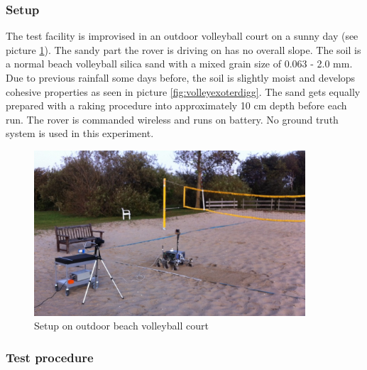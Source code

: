 \documentclass[a4paper,twocolumn]{esapub2005} %
\begin{document}
\subsubsection{Setup}
The test facility is improvised in an outdoor volleyball court on a sunny day (see picture \ref{fig:volley}). The sandy part the rover is driving on has no overall slope. The soil is a normal beach volleyball silica sand with a mixed grain size of 0.063 - 2.0 mm. Due to previous rainfall some days before, the soil is slightly moist and develops cohesive properties as seen in picture \ref{fig:volleyexoterdigg}. The sand gets equally prepared with a raking procedure into approximately 10 cm depth before each run.
The rover is commanded wireless and runs on battery. No ground truth system is used in this experiment. 


\begin{figure}[h!]
	\centering		\includegraphics[width=0.9\textwidth]{volley.JPG}	
	\caption{Setup on outdoor beach volleyball court}
	\label{fig:volley}
\end{figure}

\subsubsection{Test procedure}
\end{document}
